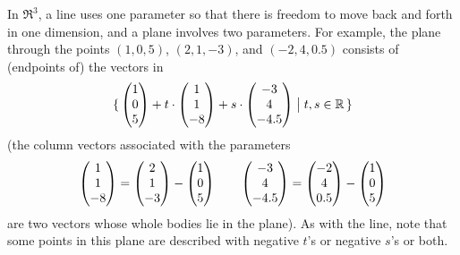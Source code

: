 In $\Re^3$, 
a line uses one parameter so that there is freedom to move back and forth 
in one dimension,
and a plane involves two parameters.
For example, the plane through the points
\( (1,0,5) \), \( (2,1,-3) \), and \( (-2,4,0.5) \) consists of
(endpoints of) the vectors in
\begin{equation*}
  \mbox{$\{\, \begin{pmatrix} 1 \\ 0 \\ 5 \end{pmatrix}
         +t\cdot\begin{pmatrix} 1 \\ 1 \\ -8 \end{pmatrix}
         +s\cdot\begin{pmatrix} -3 \\ 4 \\ -4.5 \end{pmatrix}
       \bigm| t,s\in\mathbb{R}      \,\}$}
\end{equation*}
(the column vectors associated with the parameters
\begin{equation*}
  \begin{pmatrix} 1 \\ 1 \\ -8 \end{pmatrix}
  =
  \begin{pmatrix} 2 \\ 1 \\ -3 \end{pmatrix}
  -
  \begin{pmatrix} 1 \\ 0 \\ 5 \end{pmatrix}
  \qquad
  \begin{pmatrix} -3 \\ 4 \\ -4.5 \end{pmatrix}
  =
  \begin{pmatrix} -2 \\ 4 \\ 0.5 \end{pmatrix}
  -
  \begin{pmatrix} 1 \\ 0 \\ 5 \end{pmatrix}
\end{equation*}
are two vectors whose whole bodies lie in the plane).
As with the line, note that some points in this plane are described
with negative $t$'s or negative $s$'s or both.

